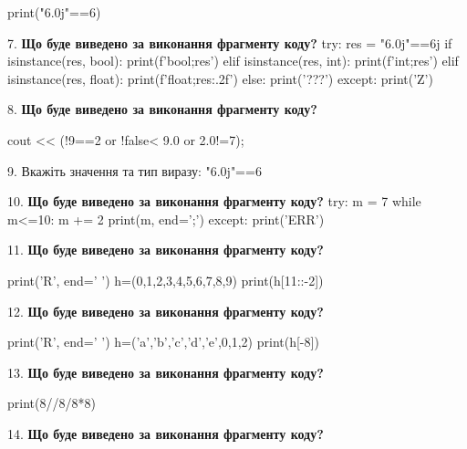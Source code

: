 \documentclass[11pt]{article}
\begin{document}
print("6.0j"==6)
\par\vspace{5mm}

7. \textbf{Що буде виведено за виконання фрагменту коду?}
try:
    res = "6.0j"==6j
    if isinstance(res, bool):
        print(f'bool;{res}')
    elif isinstance(res, int):
        print(f'int;{res}')
    elif isinstance(res, float):
        print(f'float;{res:.2f}')
    else:
        print('???')
except:
    print('Z')
\par\vspace{5mm}

8. \textbf{Що буде виведено за виконання фрагменту коду?}

cout << (!9==2 or !false< 9.0 or 2.0!=7);
\par\vspace{5mm}

9. 
Вкажіть значення та тип виразу:
"6.0j"==6
\par\vspace{5mm}

10. \textbf{Що буде виведено за виконання фрагменту коду?}
try:
    m = 7
    while m<=10:
        m += 2
    print(m, end=';')
except:
    print('ERR')
\par\vspace{5mm}

11. \textbf{Що буде виведено за виконання фрагменту коду?}

print('R', end=' ')
h=(0,1,2,3,4,5,6,7,8,9)
print(h[11::-2])

\par\vspace{5mm}

12. \textbf{Що буде виведено за виконання фрагменту коду?}

print('R', end=' ')
h=('a','b','c','d','e',0,1,2)
print(h[-8])

\par\vspace{5mm}

13. \textbf{Що буде виведено за виконання фрагменту коду?}

print(8//8/8*8)
\par\vspace{5mm}

14. \textbf{Що буде виведено за виконання фрагменту коду?}
\end{document}
